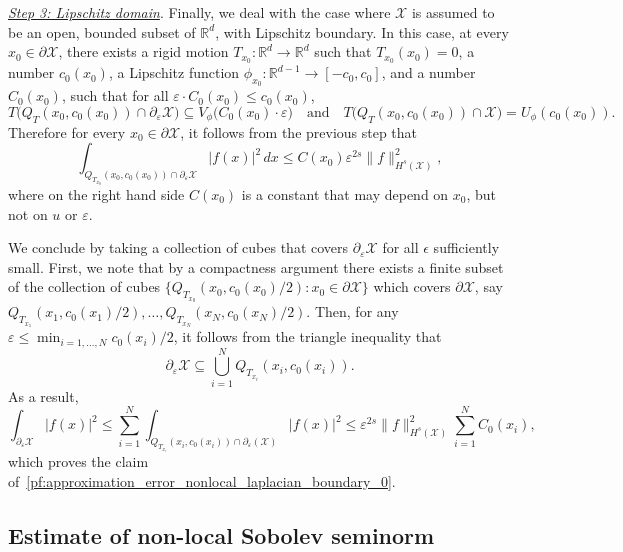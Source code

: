\documentclass[aos]{imsart}
\theoremstyle{plain}
\theoremstyle{definition}
\theoremstyle{remark}
\def\R{\mathbb{R}}
\newcommand{\mc}[1]{\mathcal{#1}}
\newcommand{\Reals}{\mathbb{R}} %
\newcommand{\Rd}{\Reals^d}
\newcommand{\1}{\mathbf{1}}
\begin{document}
\underline{\textit{Step 3: Lipschitz domain}}.
Finally, we deal with the case where $\mc{X}$ is assumed to be an open, bounded subset of $\Rd$, with Lipschitz boundary. In this case, at every $x_0 \in \partial \mc{X}$, there exists a rigid motion $T_{x_0}: \Rd \to \Rd$ such that $T_{x_0}(x_0) = 0$, a number $c_0(x_0)$, a Lipschitz function $\phi_{x_0}:\Reals^{d - 1} \to [-c_0,c_0]$, and a number $C_0(x_0)$, such that for all $\varepsilon \cdot C_0(x_0) \leq c_0(x_0)$,
\begin{equation*}
T\bigl(Q_{T}(x_0,c_0(x_0)) \cap \partial_{\varepsilon}\mc{X}\bigr) \subseteq V_{\phi}\bigl(C_0(x_0) \cdot \varepsilon\bigr) \quad\textrm{and}\quad T\bigl(Q_T(x_0,c_0(x_0)) \cap \mc{X}\bigr) = U_{\phi}(c_0(x_0)).
\end{equation*}
Therefore for every $x_0 \in \partial \mc{X}$, it follows from the previous step that
\begin{equation*}
\int_{Q_{T_{x_0}}(x_0,c_0(x_0)) \cap \partial_{\varepsilon}\mc{X}} |f(x)|^2 \,dx \leq C(x_0) \varepsilon^{2s} \|f\|_{H^s(\mc{X})}^2,
\end{equation*}
where on the right hand side $C(x_0)$ is a constant that may depend on $x_0$, but not on $u$ or $\varepsilon$.

We conclude by taking a collection of cubes that covers $\partial_{\varepsilon}\mc{X}$ for all $\epsilon$ sufficiently small. First, we note that by a compactness argument there exists a finite subset of the collection of cubes $\{Q_{T_{x_0}}(x_0,c_0(x_0)/2): x_0 \in \partial\mc{X} \}$ which covers $\partial \mc{X}$, say $Q_{T_{x_1}}(x_1,c_0(x_1)/2),\ldots, Q_{T_{x_N}}(x_N,c_0(x_N)/2)$. Then, for any $\varepsilon \leq \min_{i = 1,\ldots,N} c_0(x_i)/2$, it follows from the triangle inequality that
\begin{equation*}
\partial_{\varepsilon}\mc{X} \subseteq \bigcup_{i = 1}^{N} Q_{T_{x_i}}(x_i, c_0(x_i)).
\end{equation*}
As a result,
\begin{equation*}
\int_{\partial_{\varepsilon}\mc{X}} |f(x)|^2 \leq \sum_{i = 1}^{N} \int_{Q_{T_{x_i}}(x_i, c_0(x_i)) \cap \partial_{\varepsilon}(\mc{X})} |f(x)|^2 \leq  \varepsilon^{2s} \|f\|_{H^s(\mc{X})}^2 \sum_{i = 1}^{N}C_0(x_i),
\end{equation*}
which proves the claim of~\eqref{pf:approximation_error_nonlocal_laplacian_boundary_0}.

\subsection{Estimate of non-local Sobolev seminorm}
\label{subsec:estimate_nonlocal_seminorm}
\end{document}

